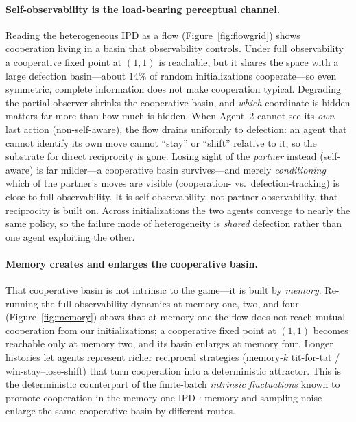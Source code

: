 \documentclass{article}
\begin{document}
\paragraph{Self-observability is the load-bearing perceptual channel.}
Reading the heterogeneous IPD as a flow (Figure~\ref{fig:flowgrid}) shows cooperation living in a basin that observability controls. Under full observability a cooperative fixed point at $(1,1)$ is reachable, but it shares the space with a large defection basin---about $14\%$ of random initializations cooperate---so even symmetric, complete information does not make cooperation typical. Degrading the partial observer shrinks the cooperative basin, and \emph{which} coordinate is hidden matters far more than how much is hidden. When Agent~2 cannot see its \emph{own} last action (non-self-aware), the flow drains uniformly to defection: an agent that cannot identify its own move cannot ``stay'' or ``shift'' relative to it, so the substrate for direct reciprocity is gone. Losing sight of the \emph{partner} instead (self-aware) is far milder---a cooperative basin survives---and merely \emph{conditioning} which of the partner's moves are visible (cooperation- vs.\ defection-tracking) is close to full observability. It is self-observability, not partner-observability, that reciprocity is built on. Across initializations the two agents converge to nearly the same policy, so the failure mode of heterogeneity is \emph{shared} defection rather than one agent exploiting the other.

\paragraph{Memory creates and enlarges the cooperative basin.}
That cooperative basin is not intrinsic to the game---it is built by \emph{memory}. Re-running the full-observability dynamics at memory one, two, and four (Figure~\ref{fig:memory}) shows that at memory one the flow does not reach mutual cooperation from our initializations; a cooperative fixed point at $(1,1)$ becomes reachable only at memory two, and its basin enlarges at memory four. Longer histories let agents represent richer reciprocal strategies (memory-$k$ tit-for-tat / win-stay--lose-shift) that turn cooperation into a deterministic attractor. This is the deterministic counterpart of the finite-batch \emph{intrinsic fluctuations} known to promote cooperation in the memory-one IPD \cite{8}: memory and sampling noise enlarge the same cooperative basin by different routes.
\end{document}
